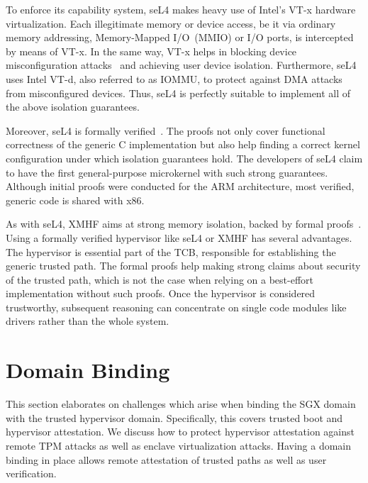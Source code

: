 \documentclass{sig-alternate-05-2015}
\newcommand{\VTx}{\mbox{VT-x}}
\newcommand{\VTd}{\mbox{VT-d}}
\begin{document}
To enforce its capability system, seL4 makes heavy use of Intel's \VTx{} hardware virtualization. 
Each illegitimate memory or device access, be it via ordinary memory addressing, Memory-Mapped I/O~(MMIO) or I/O ports, is intercepted by means of \VTx{}. 
In the same way, \VTx{} helps in blocking device misconfiguration attacks~\cite{zhou_building_2012} and achieving user device isolation. 
Furthermore, seL4 uses Intel \VTd{}, also referred to as IOMMU,  to protect against DMA attacks from misconfigured devices. 
Thus, seL4 is perfectly suitable to implement all of the above isolation guarantees.

Moreover, seL4 is formally verified~\cite{sel4proof,murray_sel4:_2013}. 
The proofs not only cover functional correctness of the generic C implementation but also help finding a correct kernel configuration under which isolation guarantees hold. 
The developers of seL4 claim to have the first general-purpose microkernel with such strong guarantees. 
Although initial proofs were conducted for the ARM architecture, most verified, generic code is shared with x86.  

As with seL4, XMHF aims at strong memory isolation, backed by formal proofs~\cite{vasudevan_design_2013}. 
Using a formally verified hypervisor like seL4 or XMHF has several advantages. 
The hypervisor is essential part of the TCB, responsible for establishing the generic trusted path. 
The formal proofs help making strong claims about security of the trusted path, which is not the case when relying on a best-effort implementation without such proofs. 
Once the hypervisor is considered trustworthy, subsequent reasoning can concentrate on single code modules like drivers rather than the whole system. 



\section{Domain Binding}\label{sec:security}

This section elaborates on challenges which arise when binding the SGX domain with the trusted hypervisor domain. 
Specifically, this covers trusted boot and hypervisor attestation. 
We discuss how to protect hypervisor attestation against remote TPM attacks as well as enclave virtualization attacks. 
Having a domain binding in place allows remote attestation of trusted paths as well as user verification.
\end{document}
